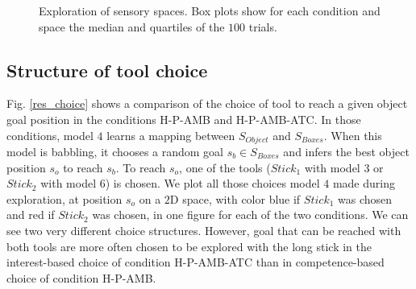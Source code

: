 \documentclass[10pt,letterpaper]{article}
\begin{document}
\begin{figure}[ht]
			\caption{Exploration of sensory spaces. Box plots show for each condition and space the median and quartiles of the $100$ trials.}
			\label{res_explo}
		\end{figure}

	
	\subsection{Structure of tool choice}

		Fig. \ref{res_choice} shows a comparison of the choice of tool to reach a given object goal position in the conditions H-P-AMB and H-P-AMB-ATC.
		In those conditions, model $4$ learns a mapping between $S_{Object}$ and $S_{Boxes}$. 
		When this model is babbling, it chooses a random goal $s_b \in S_{Boxes}$ and infers the best object position $s_o$ to reach $s_b$.
		To reach $s_o$, one of the tools ($Stick_1$ with model $3$ or $Stick_2$ with model $6$) is chosen. 
		We plot all those choices model $4$ made during exploration, at position $s_o$ on a $2$D space, with color blue if $Stick_1$ was chosen and red if $Stick_2$ was chosen, in one figure for each of the two conditions.
		We can see two very different choice structures.
		However, goal that can be reached with both tools are more often chosen to be explored with the long stick in the interest-based choice of condition H-P-AMB-ATC than in competence-based choice of condition H-P-AMB.
		
\end{document}
